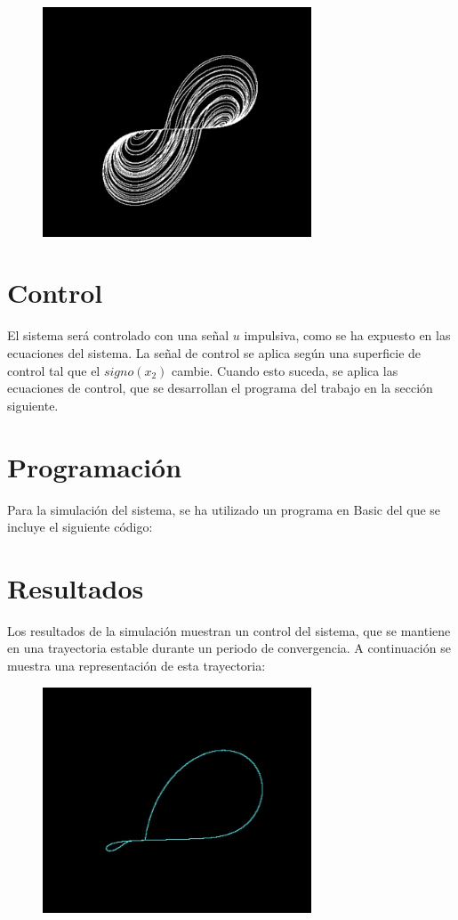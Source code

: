 \documentclass[DIV=20]{scrartcl}
\begin{document}
\begin{figure}[h]
	\centering
	\includegraphics[width=8cm]{caos}
\end{figure}

\section{Control}

El sistema será controlado con una señal $u$ impulsiva, como se ha expuesto en
las ecuaciones del sistema. La señal de control se aplica según una superficie
de control tal que el $signo(x_2)$ cambie. Cuando esto suceda, se aplica las
ecuaciones de control, que se desarrollan el programa del trabajo en la sección siguiente.

\section{Programación}

Para la simulación del sistema, se ha utilizado un programa en Basic del que se
incluye el siguiente código:



\section{Resultados}

Los resultados de la simulación muestran un control del sistema, que se mantiene
en una trayectoria estable durante un periodo de convergencia. A continuación se
muestra una representación de esta trayectoria:

\begin{figure}[h]
	\centering
	\includegraphics[width=8cm]{control}
\end{figure}
\end{document}
